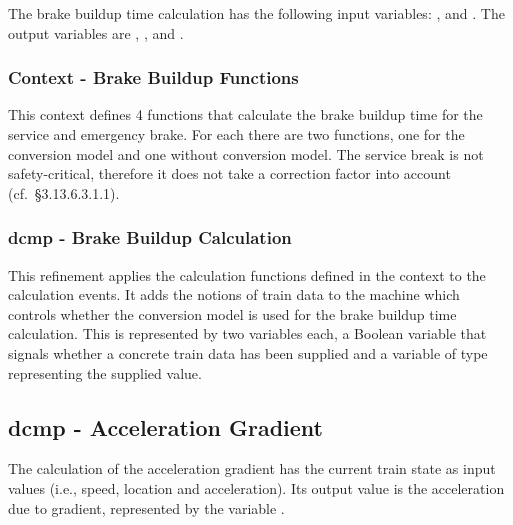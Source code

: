 \documentclass{template/openetcs_article}
\begin{document}
The brake buildup time calculation has the following input variables:
,  and . The output
variables are , ,  and
.

{\footnotesize

}

\subsubsection{Context - Brake Buildup Functions}
\label{sec:cont-brake-build}

This context defines 4 functions that calculate the brake buildup time for the
service and emergency brake. For each there are two functions, one for the
conversion model and one without conversion model. The service break is not
safety-critical, therefore it does not take a correction factor into account
(cf.~§3.13.6.3.1.1).




\subsubsection{dcmp - Brake Buildup Calculation}
\label{sec:dcmp-brake-buildup-1}

This refinement applies the calculation functions defined in the context to the
calculation events. It adds the notions of train data to the machine which
controls whether the conversion model is used for the brake buildup time
calculation. This is represented by two variables each, a Boolean variable that
signals whether a concrete train data has been supplied and a variable of type
 representing the supplied value.

{\footnotesize

}

\subsection{dcmp - Acceleration Gradient}
\label{sec:dcmp-accel-grad}

The calculation of the acceleration gradient has the current train state as
input values (i.e., speed, location and acceleration). Its output value is the
acceleration due to gradient, represented by the variable .

{\footnotesize

}
\end{document}
